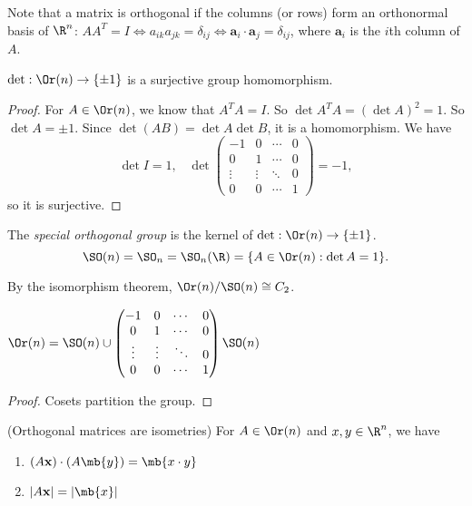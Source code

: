 \documentclass[a4paper]{article}
\begin{document}
Note that a matrix is orthogonal if the columns (or rows) form an orthonormal basis of $\R^n$: $AA^T = I\Leftrightarrow a_{ik}a_{jk} = \delta_{ij} \Leftrightarrow \mathbf{a}_i\cdot \mathbf{a}_j = \delta_{ij}$, where $\mathbf{a}_i$ is the $i$th column of $A$.

\begin{prop}
  $\det: \Or(n) \to \{\pm 1\}$ is a surjective group homomorphism.
\end{prop}

\begin{proof}
  For $A\in \Or(n)$, we know that $A^TA = I$. So $\det A^TA = (\det A)^2  = 1$. So $\det A = \pm 1$. Since $\det(AB) = \det A\det B$, it is a homomorphism. We have
  \[
    \det I = 1,\;\;\;\det
    \begin{pmatrix}
      -1 & 0 &\cdots & 0\\
      0 & 1 & \cdots & 0\\
      \vdots & \vdots & \ddots & 0\\
      0 & 0 & \cdots & 1
    \end{pmatrix} = -1,
  \]
  so it is surjective.
\end{proof}

\begin{defi}
  The \emph{special orthogonal group} is the kernel of $\det: \Or(n) \to \{\pm 1\}$.
  \[
    \SO(n) =\SO_n = \SO_n(\R) = \{A\in \Or(n): \det A = 1\}.
  \]
\end{defi}
By the isomorphism theorem, $\Or(n)/\SO(n) \cong C_2$.

\begin{lemma}
  $\Or(n) = \SO(n) \cup
  \begin{pmatrix}
    -1 & 0 &\cdots & 0\\
    0 & 1 & \cdots & 0\\
    \vdots & \vdots & \ddots & 0\\
    0 & 0 & \cdots &1
  \end{pmatrix}\SO(n)$
\end{lemma}

\begin{proof}
  Cosets partition the group.
\end{proof}

\begin{lemma}
  (Orthogonal matrices are isometries) For $A\in \Or(n)$ and $x, y\in \R^n$, we have
  \begin{enumerate}
    \item $(A\mathbf{x})\cdot (A\mb{y}) = \mb{x\cdot y}$
    \item $|A\mathbf{x}| = |\mb{x}|$
  \end{enumerate}
\end{lemma}
\end{document}
